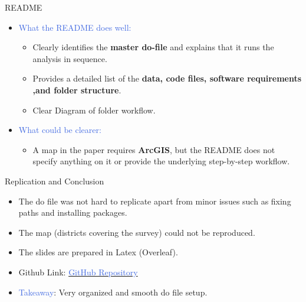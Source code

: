 \documentclass[aspectratio=169,11pt]{beamer}
\begin{document}
\begin{frame}{README}
  \begin{itemize}
    
    \item \textcolor{RoyalBlue}{What the README does well:}
    \begin{itemize}
        \item Clearly identifies the \textbf{master do-file} and explains that it runs the analysis in sequence.
        \item Provides a detailed list of the \textbf{data, code files, software requirements ,and folder structure}.
        \item Clear Diagram of folder workflow. 
        
    \end{itemize}
    \item \textcolor{RoyalBlue}{What could be clearer:}
    \begin{itemize}
        
        \item A map in the paper requires \textbf{ArcGIS}, but the README does not specify anything on it or provide the underlying step-by-step workflow. 
    
  \end{itemize}
  \end{itemize}
\end{frame}


\begin{frame}{Replication and Conclusion}
  \begin{itemize}
    \item The do file was not hard to replicate apart from minor issues such as fixing paths and installing packages. 
    \item The map (districts covering the survey) could not be reproduced. 
    \item The slides are prepared in Latex (Overleaf). 
    \item Github Link: \href{https://github.com/Arjab1999/RM_tutorial}{\textcolor{RoyalBlue}{GitHub Repository}}
    \item \textcolor{RoyalBlue}{Takeaway}: Very organized and smooth do file setup. 


    \end{itemize}

    
    
  
\end{frame}
\end{document}
